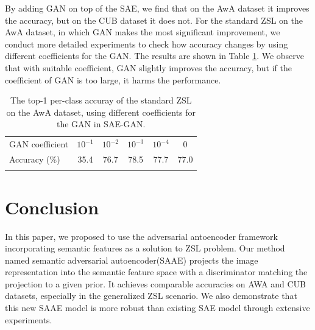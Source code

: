 \documentclass{article}
\begin{document}
By adding GAN on top of the SAE, we find that on the AwA dataset it improves the accuracy, but on the CUB dataset it does not. For the standard ZSL on the AwA dataset, in which GAN makes the most significant improvement, we conduct more detailed experiments to check how accuracy changes by using different coefficients for the GAN. The results are shown in Table \ref{tab:SAEGAN}. We observe that with suitable coefficient, GAN slightly improves the accuracy, but if the coefficient of GAN is too large, it harms the performance.


\begin{table}[t]
\centering
\begin{tabular}{lccccc}
\toprule
GAN coefficient & $10^{-1}$ & $10^{-2}$ & $10^{-3}$ & $10^{-4}$ & 0 \\
Accuracy (\%) & 35.4 & 76.7 & 78.5 & 77.7 & 77.0 \\
\bottomrule \\
\end{tabular}
\caption{The top-1 per-class accuray of the standard ZSL on the AwA dataset, using different coefficients for the GAN in SAE-GAN.}
\label{tab:SAEGAN}
\end{table}



\section{Conclusion}

In this paper, we proposed to use the adversarial antoencoder framework incorporating semantic features as a solution to ZSL problem. Our method named semantic adversarial autoencoder(SAAE) projects the image representation into the semantic feature space with a discriminator matching the projection to a given prior. It achieves comparable accuracies on AWA and CUB datasets, especially in the generalized ZSL scenario. We also demonstrate that this new SAAE model is more robust than existing SAE model through extensive experiments. 


\newpage



\end{document}
